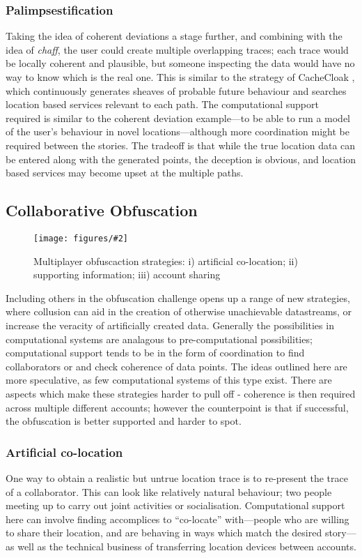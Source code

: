 \documentclass{IOS-Book-Article}     %
\newcommand{\fig}[3][0.9]{
\begin{figure}[tp]
\begin{center}
\texttt{[image: figures/\#2]}
\caption{#3}
\label{fig:#2}
\end{center}
\end{figure}
}
\newcommand{\tbox}[3][red]{{
\color{#1}\noindent{
   \fbox{\scriptsize{ {\bf #2} \textsl{#3}}}
   \vspace{2pt}
}
}}
\newcommand{\todo}[1]{\tbox{TODO:}{#1}}
\begin{document}
\subsubsection{Palimpsestification}
Taking the idea of coherent deviations a stage further, and combining with the
idea of \emph{chaff}, the user could create multiple overlapping traces; each
trace would be locally coherent and plausible, but someone inspecting the data would have no way to know which is the real one.
This is similar to the strategy of CacheCloak \todo{reference}, which
continuously generates sheaves of probable future behaviour and searches
location based services relevant to each  path. The computational support
required is similar to the coherent deviation example---to be able to run a
model of the user's behaviour in novel locations---although more coordination
might be required between the stories. The tradeoff is that while the true
location data can be entered along with the generated points, the deception is
obvious, and location based services may become upset at the multiple paths.

\subsection{Collaborative Obfuscation}
\fig{MultiPlayerObfuscation}{Multiplayer obfuscaction strategies: i) artificial
co-location; ii) supporting information; iii) account sharing}

Including others in the obfuscation challenge opens up a range of new 
strategies, where collusion can aid in the creation of otherwise unachievable
datastreams, or increase the veracity of artificially created data. Generally
the possibilities in computational systems are analagous to pre-computational
possibilities; computational support tends to be in the form of coordination to
find collaborators or and check coherence of data points. The ideas outlined
here are more speculative, as few computational systems of this type exist.
There are aspects which make these strategies harder to pull off - coherence is
then required across multiple different accounts; however the counterpoint is
that if successful, the obfuscation is better supported and harder to spot.

\subsubsection{Artificial co-location}
One way to obtain a realistic but untrue location trace is to re-present the
trace of a collaborator. This can look like relatively natural
behaviour; two people meeting up to carry out joint activities or socialisation.
Computational support here can involve finding accomplices to ``co-locate''
with---people who are willing to share their location, and are behaving in ways
which match the desired story---as well as the technical business of
transferring location devices between accounts.
\end{document}
